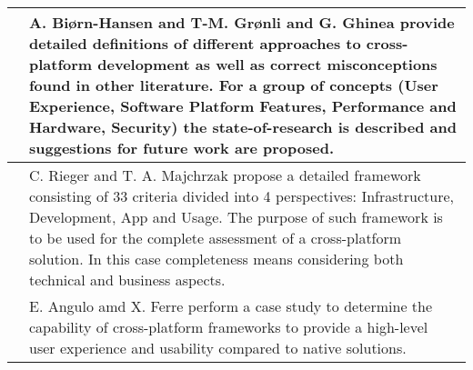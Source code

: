 \begin{table}[h]
\begin{tabular}{ |c|p{}| }
        \hline
        \cite{survey_taxonomy_cross_platform}&A. Biørn-Hansen and T-M. Grønli and G. Ghinea provide detailed definitions of different approaches to cross-platform development as well as correct misconceptions found in other literature. For a group of concepts (User Experience, Software Platform Features, Performance and Hardware, Security) the state-of-research is described and suggestions for future work are proposed.\\
        \hline
        \cite{rieger_eval_cp}&C. Rieger and T. A. Majchrzak propose a detailed framework consisting of 33 criteria divided into 4 perspectives: Infrastructure, Development, App and Usage. The purpose of such framework is to be used for the complete assessment of a cross-platform solution. In this case completeness means considering both technical and business aspects.\\
		\hline
        \cite{cross_platform_ux}&E. Angulo amd X. Ferre perform a case study to determine the capability of cross-platform frameworks to provide a high-level user experience and usability compared to native solutions.\\
		\hline
	\end{tabular}
\end{table}
